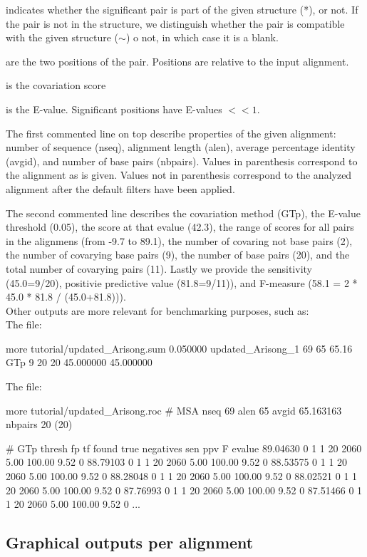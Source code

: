 \begin{sreitems}{}
\item[\emprog{First column}] indicates whether the significant pair is
  part of the given structure (*), or not.  If the pair is not in the
  structure, we distinguish whether the pair is compatible with the
  given structure ($\sim$) o not, in which case it is a blank.

\item[\emprog{Second and third columns}] are the two positions of the
  pair. Positions are relative to the input alignment.

\item[\emprog{Forth column}] is the covariation score

\item[\emprog{Fifth column}] is the E-value. Significant positions
  have E-values $<< 1$.
\end{sreitems}

The first commented line on top describe properties of the given
alignment: number of sequence (nseq), alignment length (alen), average
percentage identity (avgid), and number of base pairs (nbpairs).
Values in parenthesis correspond to the alignment as is given. Values
not in parenthesis correspond to the analyzed alignment after the
default filters have been applied.

The second commented line describes the covariation method (GTp), the
E-value threshold (0.05), the score at that evalue (42.3), the range
of scores for all pairs in the alignmens (from -9.7 to 89.1), the
number of covaring not base pairs (2), the number of covarying base
pairs (9), the number of base pairs (20), and the total number of
covarying pairs (11). Lastly we provide the sensitivity (45.0=9/20),
positivie predictive value (81.8=9/11)), and F-measure (58.1 = 2 *
45.0 * 81.8 / (45.0+81.8))).\\

Other outputs are more relevant for benchmarking purposes, such as:\\
The  file:

\begin{sreoutput}
more tutorial/updated_Arisong.sum 
0.050000        updated_Arisong_1       69      65      65.16    GTp 9 20 20 45.000000 45.000000 
\end{sreoutput}

The  file:
\begin{sreoutput}
more tutorial/updated_Arisong.roc
# MSA nseq 69 alen 65 avgid 65.163163 nbpairs 20 (20)

# GTp thresh fp tf found true negatives sen ppv F evalue
89.04630 0 1 1 20 2060 5.00 100.00 9.52 0
88.79103 0 1 1 20 2060 5.00 100.00 9.52 0
88.53575 0 1 1 20 2060 5.00 100.00 9.52 0
88.28048 0 1 1 20 2060 5.00 100.00 9.52 0
88.02521 0 1 1 20 2060 5.00 100.00 9.52 0
87.76993 0 1 1 20 2060 5.00 100.00 9.52 0
87.51466 0 1 1 20 2060 5.00 100.00 9.52 0
...
\end{sreoutput}


\subsection{Graphical outputs per alignment}



